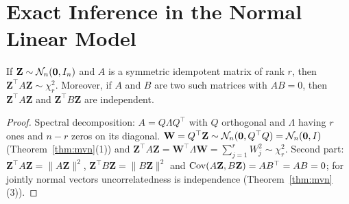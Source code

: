\documentclass[main.tex]{subfiles}
\begin{document}
\section{Exact Inference in the Normal Linear Model}

\begin{lemma}\label{lem:idempotent}
If $\mathbf Z\sim\mathcal{N}_n(\mathbf 0,I_n)$ and $A$ is a symmetric idempotent matrix of rank $r$, then $\mathbf Z^\top A\mathbf Z\sim\chi^2_r$. Moreover, if $A$ and $B$ are two such matrices with $AB=0$, then $\mathbf Z^\top A\mathbf Z$ and $\mathbf Z^\top B\mathbf Z$ are independent.
\end{lemma}
\begin{proof}
Spectral decomposition: $A=Q\Lambda Q^\top$ with $Q$ orthogonal and $\Lambda$ having $r$ ones and $n-r$ zeros on its diagonal. $\mathbf W=Q^\top\mathbf Z\sim\mathcal{N}_n(\mathbf 0,Q^\top Q)=\mathcal{N}_n(\mathbf 0,I)$ (Theorem~\ref{thm:mvn}(1)) and $\mathbf Z^\top A\mathbf Z=\mathbf W^\top\Lambda\mathbf W=\sum_{j=1}^rW_j^2\sim\chi^2_r$. Second part: $\mathbf Z^\top A\mathbf Z=\|A\mathbf Z\|^2$, $\mathbf Z^\top B\mathbf Z=\|B\mathbf Z\|^2$ and $\operatorname{Cov}(A\mathbf Z,B\mathbf Z)=AB^\top=AB=0$; for jointly normal vectors uncorrelatedness is independence (Theorem~\ref{thm:mvn}(3)).
\end{proof}
\end{document}
